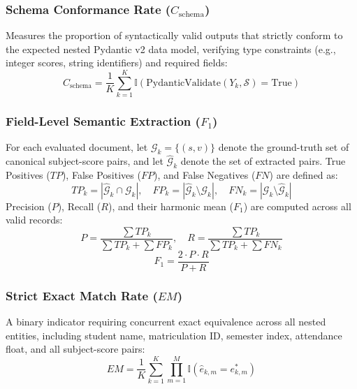 \documentclass[conference]{IEEEtran}
\begin{document}
{\subsubsection{Schema Conformance Rate ($C_{\text{schema}}$)}
Measures the proportion of syntactically valid outputs that strictly conform to the expected nested Pydantic v2 data model, verifying type constraints (e.g., integer scores, string identifiers) and required fields:
\begin{equation}
C_{\text{schema}} = \frac{1}{K} \sum_{k=1}^K \mathbb{I}\left(\text{PydanticValidate}(Y_k, \mathcal{S}) = \text{True}\right)
\label{eq:c_schema}
\end{equation}

\subsubsection{Field-Level Semantic Extraction ($F_1$)}
For each evaluated document, let $\mathcal{G}_k = \{(s, v)\}$ denote the ground-truth set of canonical subject-score pairs, and let $\hat{\mathcal{G}}_k$ denote the set of extracted pairs. True Positives ($TP$), False Positives ($FP$), and False Negatives ($FN$) are defined as:
\begin{equation}
TP_k = |\hat{\mathcal{G}}_k \cap \mathcal{G}_k|, \quad FP_k = |\hat{\mathcal{G}}_k \setminus \mathcal{G}_k|, \quad FN_k = |\mathcal{G}_k \setminus \hat{\mathcal{G}}_k|
\end{equation}
Precision ($P$), Recall ($R$), and their harmonic mean ($F_1$) are computed across all valid records:
\begin{equation}
P = \frac{\sum TP_k}{\sum TP_k + \sum FP_k}, \quad R = \frac{\sum TP_k}{\sum TP_k + \sum FN_k}
\end{equation}
\begin{equation}
F_1 = \frac{2 \cdot P \cdot R}{P + R}
\label{eq:f1}
\end{equation}

\subsubsection{Strict Exact Match Rate ($EM$)}
A binary indicator requiring concurrent exact equivalence across all nested entities, including student name, matriculation ID, semester index, attendance float, and all subject-score pairs:
\begin{equation}
EM = \frac{1}{K} \sum_{k=1}^K \prod_{m=1}^M \mathbb{I}(\hat{e}_{k,m} = e_{k,m}^*)
\label{eq:em}
\end{equation}

}
\end{document}
